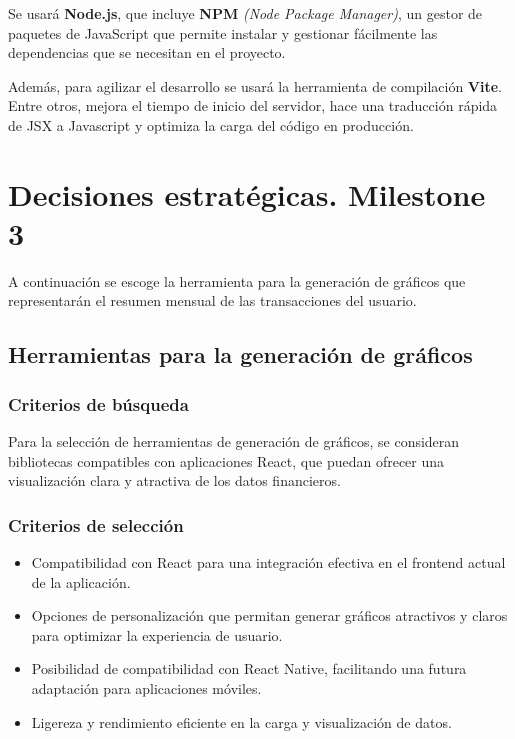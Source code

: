 Se usará \textbf{Node.js}, que incluye \textbf{NPM} \textit{(Node Package Manager)}, un gestor de paquetes de JavaScript que permite instalar y gestionar  fácilmente las dependencias que se necesitan en el proyecto.

Además, para agilizar el desarrollo se usará la herramienta de compilación \textbf{Vite}. Entre otros, mejora el tiempo de inicio del servidor, hace una traducción rápida de JSX a Javascript y optimiza la carga del código en producción.


\section{Decisiones estratégicas. Milestone 3}
A continuación se escoge la herramienta para la generación de gráficos que representarán el resumen mensual de las transacciones del usuario.
\subsection{Herramientas para la generación de gráficos}
\subsubsection{Criterios de búsqueda}
Para la selección de herramientas de generación de gráficos, se consideran bibliotecas compatibles con aplicaciones React, que puedan ofrecer una visualización clara y atractiva de los datos financieros. 

\subsubsection{Criterios de selección}
\begin{itemize}
    \item Compatibilidad con React para una integración efectiva en el frontend actual de la aplicación.
    \item Opciones de personalización que permitan generar gráficos atractivos y claros para optimizar la experiencia de usuario.
    \item Posibilidad de compatibilidad con React Native, facilitando una futura adaptación para aplicaciones móviles.
    \item Ligereza y rendimiento eficiente en la carga y visualización de datos.
\end{itemize}

